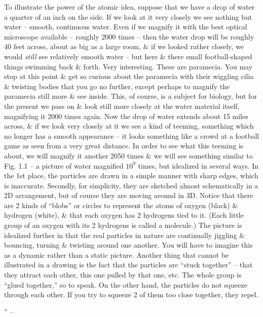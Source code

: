 \documentclass{article}
\begin{document}
To illustrate the power of the atomic idea, suppose that we have a drop of water a quarter of an inch on the side. If we look at it very closely we see nothing but water -- smooth, continuous water. Even if we magnify it with the best optical microscope available -- roughly 2000 times -- then the water drop will be roughly 40 feet across, about as big as a large room, \& if we looked rather closely, we would {\it still} see relatively smooth water -- but here \& there small football-shaped things swimming back \& forth. Very interesting. These are paramecia. You may stop at this point \& get so curious about the paramecia with their wiggling cilia \& twisting bodies that you go no further, except perhaps to magnify the paramecia still more \& see inside. This, of course, is a subject for biology, but for the present we pass on \& look still more closely at the water material itself, magnifying it 2000 times again. Now the drop of water extends about 15 miles across, \& if we look very closely at it we see a kind of teeming, something which no longer has a smooth appearance -- it looks something like a crowd at a football game as seen from a very great distance. In order to see what this teeming is about, we will magnify it another 2050 times \& we will see something similar to {\sf Fig. 1.1} -- a picture of water magnified $10^9$ times, but idealized in several ways. In the 1st place, the particles are drawn in a simple manner with sharp edges, which is inaccurate. Secondly, for simplicity, they are sketched almost schematically in a 2D arrangement, but of course they are moving around in 3D. Notice that there are 2 kinds of ``blobs'' or circles to represent the atoms of oxygen (black) \& hydrogen (white), \& that each oxygen has 2 hydrogens tied to it. (Each little group of an oxygen with its 2 hydrogens is called a molecule.) The picture is idealized further in that the real particles in nature are continually jiggling \& bouncing, turning \& twisting around one another. You will have to imagine this as a dynamic rather than a static picture. Another thing that cannot be illustrated in a drawing is the fact that the particles are ``stuck together'' -- that they attract each other, this one pulled by that one, etc. The whole group is ``glued together,'' so to speak. On the other hand, the particles do not squeeze through each other. If you try to squeeze 2 of them too close together, they repel.



'' -- \cite[pp. 4--4]{Feyman_Leighton_Sands_6_easy_pieces}
\end{document}
